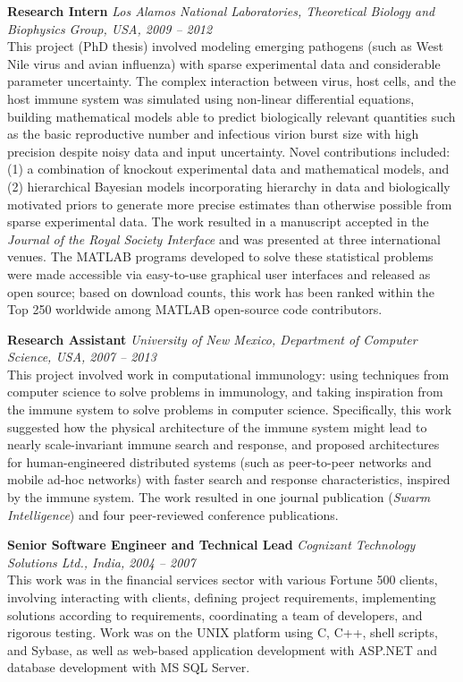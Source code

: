 \documentclass[11pt,a4paper]{article}
\newcommand{\entry}[3]{%
  \noindent\textbf{#1} \hfill \textit{#2}\\
  #3\par\smallskip
}
\begin{document}
\entry{Research Intern}{Los Alamos National Laboratories, Theoretical Biology and Biophysics Group, USA, 2009 -- 2012}{
This project (PhD thesis) involved modeling emerging pathogens (such as West Nile virus and avian influenza) with sparse experimental data and considerable parameter uncertainty. The complex interaction between virus, host cells, and the host immune system was simulated using non-linear differential equations, building mathematical models able to predict biologically relevant quantities such as the basic reproductive number and infectious virion burst size with high precision despite noisy data and input uncertainty. Novel contributions included: (1) a combination of knockout experimental data and mathematical models, and (2) hierarchical Bayesian models incorporating hierarchy in data and biologically motivated priors to generate more precise estimates than otherwise possible from sparse experimental data. The work resulted in a manuscript accepted in the \textit{Journal of the Royal Society Interface} and was presented at three international venues. The MATLAB programs developed to solve these statistical problems were made accessible via easy-to-use graphical user interfaces and released as open source; based on download counts, this work has been ranked within the Top 250 worldwide among MATLAB open-source code contributors.}

\entry{Research Assistant}{University of New Mexico, Department of Computer Science, USA, 2007 -- 2013}{
This project involved work in computational immunology: using techniques from computer science to solve problems in immunology, and taking inspiration from the immune system to solve problems in computer science. Specifically, this work suggested how the physical architecture of the immune system might lead to nearly scale-invariant immune search and response, and proposed architectures for human-engineered distributed systems (such as peer-to-peer networks and mobile ad-hoc networks) with faster search and response characteristics, inspired by the immune system. The work resulted in one journal publication (\textit{Swarm Intelligence}) and four peer-reviewed conference publications.}

\entry{Senior Software Engineer and Technical Lead}{Cognizant Technology Solutions Ltd., India, 2004 -- 2007}{
This work was in the financial services sector with various Fortune 500 clients, involving interacting with clients, defining project requirements, implementing solutions according to requirements, coordinating a team of developers, and rigorous testing. Work was on the UNIX platform using C, C++, shell scripts, and Sybase, as well as web-based application development with ASP.NET and database development with MS SQL Server.}
\end{document}
